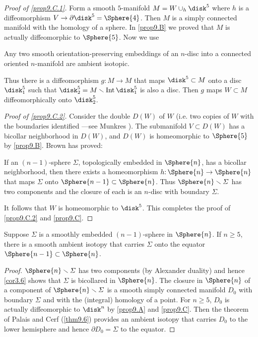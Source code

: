 \begin{proof}[Proof of \ref{prop9.C.1}]
	Form a smooth $5$-manifold $M = W\cup_h \disk^5$ where $h$ is a diffeomorphism $V\to \partial\disk^5 = \Sphere{4}$. Then $M$ is a simply connected manifold with the homology of a sphere. In \cref{prop9.B} we proved
	that $M$ is actually diffeomorphic to $\Sphere{5}$. Now we use
	\begin{theorem}\label{thm9.6}
		Any two smooth orientation-preserving embeddings of an $n$-disc
		into a connected oriented $n$-manifold are ambient isotopic. 
	\end{theorem}

Thus there is a diffeomorphism $g\mathpunct{:} M\to M$ that maps
$\disk^5\subset M$ onto a disc $\disk_1^5$ such that $\disk_2^5 = M\smallsetminus \mathrm{Int\,} \disk_1^5$ is also a disc. Then $g$ maps $W\subset M$ diffeomorphically onto $\disk_2^5$.

\noindent\textit{Proof of \ref{prop9.C.2}.}
	Consider the double $D(W)$ of $W$ (i.e. two copies of $W$ with the boundaries identified ---see Munkres \cite[p.~54]{5}).
	The submanifold $V\subset D(W)$ has a bicollar neighborhood in $D(W)$,
	and $D(W)$ is homeomorphic to $\Sphere{5}$ by \cref{prop9.B}. Brown \cite{23} has
	proved:
	
	\begin{theorem}\label{thm9.7}
		If an $(n - 1)$-sphere $\varSigma$, topologically embedded
		in $\Sphere{n}$, has a bicollar neighborhood, then there exists a homeomorphism $h\mathpunct{:}\Sphere{n}\to \Sphere{n}$ that maps $\varSigma$ onto $\Sphere{n-1}\subset \Sphere{n}$. Thus
		$\Sphere{n}\smallsetminus \varSigma$ has two components and the closure of each is an $n$-disc
		with boundary $\varSigma$.
	\end{theorem}
It follows that $W$ is homeomorphic to $\disk^5$. This completes the
proof of \ref{prop9.C.2} and \cref{prop9.C}.
\end{proof}

\begin{proposition}\label{prop9.D}
Suppose $\varSigma$ is a smoothly embedded $(n-1)$-sphere in $\Sphere{n}$. If
$n \geq 5$, there is a smooth ambient isotopy that carries $\varSigma$ onto the equator $\Sphere{n-1}\subset\Sphere{n}$.
\end{proposition}
\begin{proof}
	$\Sphere{n}\smallsetminus\varSigma$ has two components (by Alexander duality) and
	hence \cref{cor3.6} shows that $\varSigma$ is bicollared in $\Sphere{n}$. The closure in
	$\Sphere{n}$ of a component of $\Sphere{n}\smallsetminus\varSigma$ is a smooth simply connected
	manifold $D_0$ with boundary $\varSigma$ and with the (integral) 
	homology of a point. For $n\geq 5$, $D_0$ is actually diffeomorphic
	to $\disk^n$ by \cref{prop9.A} and \cref{prop9.C}. Then the theorem of Palais and Cerf
	(\cref{thm9.6}) provides an ambient isotopy that carries $D_0$ to the
	lower hemisphere and hence $\partial D_0 =\varSigma$ to the equator.
\end{proof}

